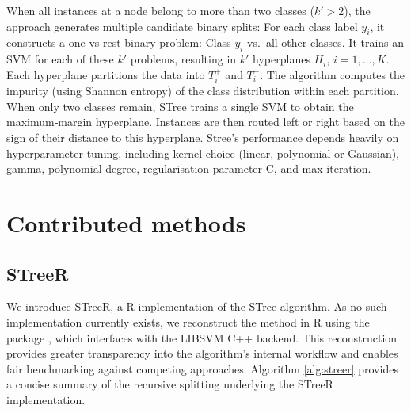 When all instances at a node belong to more than two classes (\(k'>2\)), the approach generates multiple candidate binary splits: For each class label \(y_i\), it constructs a one-vs-rest binary problem: Class \(y_i\) vs.~all other classes. It trains an SVM for each of these \(k'\) problems, resulting in \(k'\) hyperplanes \(H_i\), \(i = 1, \ldots, K\). Each hyperplane partitions the data into \(T_i^+\) and \(T_i^-\). The algorithm computes the impurity (using Shannon entropy) of the class distribution within each partition. When only two classes remain, STree trains a single SVM to obtain the maximum‑margin hyperplane. Instances are then routed left or right based on the sign of their distance to this hyperplane. Stree's performance depends heavily on hyperparameter tuning, including kernel choice (linear, polynomial or Gaussian), gamma, polynomial degree, regularisation parameter C, and max iteration.

\section{Contributed methods}\label{contributed-methods}

\subsection{STreeR}\label{streer}

We introduce STreeR, a R implementation of the STree algorithm. As no such implementation currently exists, we reconstruct the method in R using the  package \citep{e10712024}, which interfaces with the LIBSVM C++ backend. This reconstruction provides greater transparency into the algorithm's internal workflow and enables fair benchmarking against competing approaches. Algorithm \ref{alg:streer} provides a concise summary of the recursive splitting underlying the STreeR implementation.

